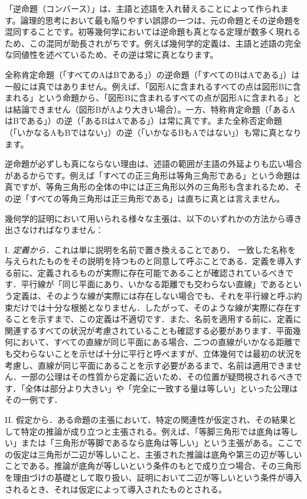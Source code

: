 \documentclass[a4paper,11pt,openany]{ltjsbook}
\begin{document}
「逆命題（コンバース）」は、主語と述語を入れ替えることによって作られます。論理的思考において最も陥りやすい誤謬の一つは、元の命題とその逆命題を混同することです。初等幾何学においては逆命題も真となる定理が数多く現れるため、この混同が助長されがちです。例えば幾何学的定義は、主語と述語の完全な同値性を述べているため、その逆は常に真となります。

全称肯定命題（「すべてのAはBである」）の逆命題（「すべてのBはAである」）は一般には真ではありません。例えば、「図形Aに含まれるすべての点は図形Bに含まれる」という命題から、「図形Bに含まれるすべての点が図形Aに含まれる」とは結論できません（図形BがAより大きい場合）。一方、特称肯定命題（「あるAはBである」）の逆（「あるBはAである」）は常に真です。また全称否定命題（「いかなるAもBではない」）の逆（「いかなるBもAではない」）も常に真となります。

逆命題が必ずしも真にならない理由は、述語の範囲が主語の外延よりも広い場合があるからです。例えば「すべての正三角形は等角三角形である」という命題は真ですが、等角三角形の全体の中には正三角形以外の三角形も含まれるため、その逆「すべての等角三角形は正三角形である」は直ちに真とは言えません。

幾何学的証明において用いられる様々な主張は、以下のいずれかの方法から導き出さなければなりません：

I. \textit{定義から．}これは単に説明を名前で置き換えることであり、
一致した名称を与えられたものをその説明を持つものと同意して呼ぶことである．定義を導入する前に、定義されるものが実際に存在可能であることが確認されているべきです．平行線が「同じ平面にあり、いかなる距離でも交わらない直線」であるという定義は、そのような線が実際には存在しない場合でも、それを平行線と呼ぶ約束だけでは十分な根拠となりません．したがって、そのような線が実際に存在することを示すまで、この定義は不適切です．また、名前を適用する前に、定義に関連するすべての状況が考慮されていることも確認する必要があります．平面幾何において、すべての直線が同じ平面にある場合、二つの直線がいかなる距離でも交わらないことを示せば十分に平行と呼べますが、立体幾何では最初の状況を考慮し、直線が同じ平面にあることを示す必要があるまで、名前は適用できません．一部の公理はその性質から定義に近いため、その位置が疑問視されるべきです．「全体は部分より大きい」や「完全に一致する量は等しい」といった公理はその一例です．

II. 假定から．ある命題の主張において、特定の関連性が仮定され、その結果として特定の推論が成り立つと主張される。例えば、「等脚三角形では底角は等しい」または「三角形が等脚であるなら底角は等しい」という主張がある。ここでの仮定は三角形が二辺が等しいこと、主張された推論は底角や第三の辺が等しいことである。推論が底角が等しいという条件のもとで成り立つ場合、その三角形を理由づけの基礎として取り扱い、証明において二辺が等しいという条件が導入されるとき、それは仮定によって導入されたものとされる。
\end{document}
